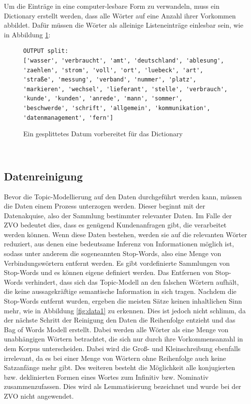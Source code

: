 \documentclass[german,version-2020-11]{uzl-thesis}
\begin{document}
\begin{itemize}
Um die Einträge in eine computer-lesbare Form zu verwandeln, muss ein Dictionary erstellt werden, dass alle Wörter auf eine Anzahl ihrer Vorkommen abbildet. Dafür müssen die Wörter als alleinige Listeneinträge einlesbar sein, wie in Abbildung \ref{fig:data2}: \\


\begin{figure}[h]
\begin{lstlisting}
OUTPUT split: 
['wasser', 'verbraucht', 'amt', 'deutschland', 'ablesung', 'zaehlen', 'strom', 'voll', 'ort', 'luebeck', 'art', 'straße', 'messung', 'verband', 'nummer', 'platz', 'markieren', 'wechsel', 'lieferant', 'stelle', 'verbrauch', 'kunde', 'kunden', 'anrede', 'mann', 'sommer', 'beschwerde', 'schrift', 'allgemein', 'kommunikation', 'datenmanagement', 'fern']
\end{lstlisting}
\caption{Ein gesplittetes Datum vorbereitet für das Dictionary}
\label{fig:data2}
\end{figure}\\


\subsection{Datenreinigung}
Bevor die Topic-Modellierung auf den Daten durchgeführt werden kann, müssen die Daten einem Prozess unterzogen werden. Dieser beginnt mit der Datenakquise, also der Sammlung bestimmter relevanter Daten. Im Falle der ZVO bedeutet dies, dass es genügend Kundenanfragen gibt, die verarbeitet werden können. Wenn diese Daten bestehen, werden sie auf die relevanten Wörter reduziert, aus denen eine bedeutsame Inferenz von Informationen möglich ist, sodass unter anderem die sogeneannten Stop-Words, also eine Menge von Verbindungswörtern entfernt werden. Es gibt vordefinierte Sammlungen von Stop-Words und es können eigene definiert werden. Das Entfernen von Stop-Words verhindert, dass sich das Topic-Modell an den falschen Wörtern aufhält, die keine aussagekräftige semantische Information in sich tragen. Nachdem die Stop-Words entfernt wurden, ergeben die meisten Sätze keinen inhaltlichen Sinn mehr, wie in Abbildung \ref{fig:data1} zu erkennen. Dies ist jedoch nicht schlimm, da der nächste Schritt der Reinigung den Daten die Reihenfolge entzieht und das Bag of Words Modell erstellt. Dabei werden alle Wörter als eine Menge von unabhängigen Wörtern betrachtet, die sich nur durch ihre Vorkommensanzahl in dem Korpus unterscheiden. Dabei wird die Groß- und Kleinschreibung ebenfalls irrelevant, da es bei einer Menge von Wörtern ohne Reihenfolge auch keine Satzanfänge mehr gibt. Des weiteren besteht die Möglichkeit alle konjugierten bzw. deklinierten Formen eines Wortes zum Infinitiv bzw. Nominativ zusammenzufassen. Dies wird als Lemmatisierung bezeichnet und wurde bei der ZVO nicht angewendet. 


\end{itemize}
\end{document}

